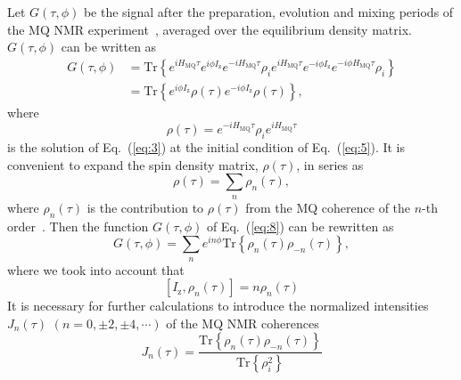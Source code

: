 Let   $G(\tau,\phi)$  be the signal after the preparation, evolution and mixing periods of the MQ NMR experiment~\cite{Baum_1985}, averaged over the equilibrium density matrix.  $G(\tau,\phi)$ can be written as~\cite{Doronin_2019}
%
\begin{equation}
    \begin{split}
        \label{eq:8}
        G(\tau,\phi)
        & = \mathrm{Tr}\left\{
            e^{i H_\mathrm{MQ} \tau} e^{i\phi I_\mathrm{z}} e^{-i H_\mathrm{MQ}\tau}
            \rho_i
            e^{i H_\mathrm{MQ} \tau} e^{-i \phi I_\mathrm{z}} e^{-i \phi H_\mathrm{MQ} \tau}
            \rho_i
        \right\} \\
        & = \mathrm{Tr} \left\{
        e^{i \phi I_\mathrm{z}}
        \rho(\tau)
        e^{-i \phi I_\mathrm{z}}
        \rho(\tau)
        \right\},
    \end{split}
\end{equation}
%
where
%
\begin{equation}
    \label{eq:9}
    \rho(\tau)
    = e^{-i H_\mathrm{MQ} \tau }
    \rho_i
    e^{i H_\mathrm{MQ} \tau}
\end{equation}
%
is the solution of Eq.~(\ref{eq:3}) at the initial condition of Eq.~(\ref{eq:5}).
It is convenient to expand the spin density matrix, $\rho(\tau)$, in series as
%
\begin{equation}
    \label{eq:10}
    \rho(\tau) = \sum\limits_n \rho_n(\tau),
\end{equation}
%
where $\rho_{n}(\tau)$ is the contribution to $\rho(\tau)$ from the MQ coherence of the $n$-th order~\cite{Fel_dman_1996}.
Then the function $G(\tau,\phi)$ of Eq.~(\ref{eq:8}) can be rewritten as
%
\begin{equation}
    \label{eq:11}
    G(\tau,\phi)
    = \sum\limits_n e^{i n \phi} \mathrm{Tr} \left\{
        \rho_{n}(\tau) \rho_{-n}(\tau)
    \right\},
\end{equation}
%
where we took into account that
%
\begin{equation}
    \label{eq:12}
    \left[ I_{\mathrm{z}},\rho_n(\tau) \right] = n \rho_n(\tau)
\end{equation}
%
It is necessary for further calculations to introduce the normalized intensities $J_{n}(\tau)$ $(n=0, \pm 2, \pm 4, \cdots)$ of the MQ NMR coherences
%
\begin{equation}
    \label{eq:13}
    J_{n}(\tau) = \dfrac{\mathrm{Tr} \left\{
    \rho_{n}(\tau) \rho_{-n}(\tau)
    \right\}}
    {\mathrm{Tr} \left\{\rho^2_{i} \right\}}
\end{equation}
